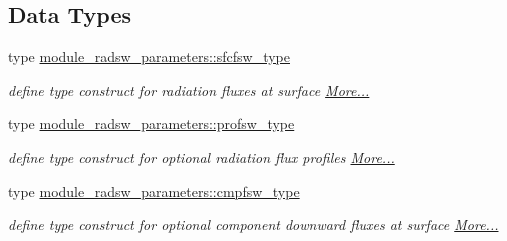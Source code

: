 \subsection*{Data Types}
\begin{DoxyCompactItemize}
\item 
type \hyperlink{group__module__radsw__main_structmodule__radsw__parameters_1_1sfcfsw__type}{module\+\_\+radsw\+\_\+parameters\+::sfcfsw\+\_\+type}
\begin{DoxyCompactList}\small\item\em define type construct for radiation fluxes at surface  \hyperlink{group__module__radsw__main_structmodule__radsw__parameters_1_1sfcfsw__type}{More...}\end{DoxyCompactList}\item 
type \hyperlink{group__module__radsw__main_structmodule__radsw__parameters_1_1profsw__type}{module\+\_\+radsw\+\_\+parameters\+::profsw\+\_\+type}
\begin{DoxyCompactList}\small\item\em define type construct for optional radiation flux profiles  \hyperlink{group__module__radsw__main_structmodule__radsw__parameters_1_1profsw__type}{More...}\end{DoxyCompactList}\item 
type \hyperlink{group__module__radsw__main_structmodule__radsw__parameters_1_1cmpfsw__type}{module\+\_\+radsw\+\_\+parameters\+::cmpfsw\+\_\+type}
\begin{DoxyCompactList}\small\item\em define type construct for optional component downward fluxes at surface  \hyperlink{group__module__radsw__main_structmodule__radsw__parameters_1_1cmpfsw__type}{More...}\end{DoxyCompactList}\end{DoxyCompactItemize}
